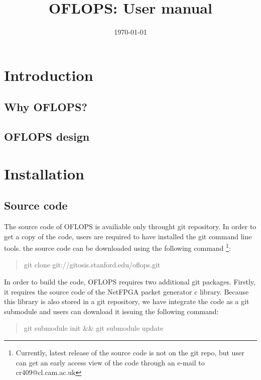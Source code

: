 \documentclass{book}
\title{OFLOPS: User manual}
\date{\today}
\begin{document}
\maketitle

\chapter{Introduction}
\section{}

\section{Why OFLOPS?}

\section{OFLOPS design}

\chapter{Installation}

\section{Source code}

The source code of OFLOPS is availiable only throught git repository.
In order to get a copy of the code, users are required to have installed 
the git command line tools. the source code can be downloaded using the 
following command \footnote{Currently, latest release of the source code is not 
  on the git repo, but user can get an early access view of the code through 
    an e-mail to cr409@cl.cam.ac.uk}: 
\begin{quote}
git clone git://gitosis.stanford.edu/oflops.git
\end{quote}

In order to build the code, OFLOPS requires two additional git packages. 
Firstly, it requires the source code of the NetFPGA packet 
generator c library. Because this library is also stored in a git repository, 
we have integrate the code as a git submodule and users can download it
issuing the following command:

\begin{quote}
git submodule init \&\& git submodule update
\end{quote}
\end{document}
